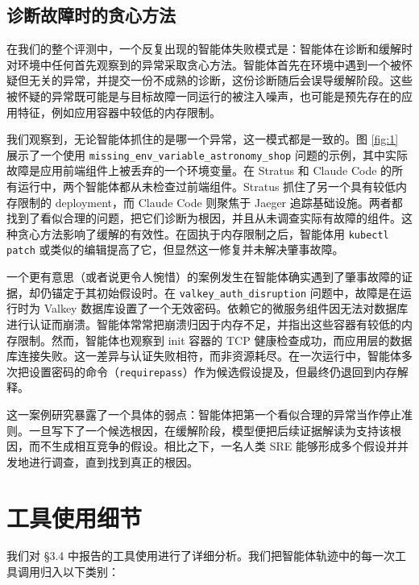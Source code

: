 \documentclass[11pt,UTF8,fontset=fandol]{ctexart}
\begin{document}
\subsection{诊断故障时的贪心方法}

在我们的整个评测中，一个反复出现的智能体失败模式是：智能体在诊断和缓解时对环境中任何首先观察到的异常采取贪心方法。智能体首先在环境中遇到一个被怀疑但无关的异常，并提交一份不成熟的诊断，这份诊断随后会误导缓解阶段。这些被怀疑的异常既可能是与目标故障一同运行的被注入噪声，也可能是预先存在的应用特征，例如应用容器中较低的内存限制。

我们观察到，无论智能体抓住的是哪一个异常，这一模式都是一致的。图 \ref{fig:1} 展示了一个使用 \texttt{missing\_env\_variable\_astronomy\_shop} 问题的示例，其中实际故障是应用前端组件上被丢弃的一个环境变量。在 Stratus 和 Claude Code 的所有运行中，两个智能体都从未检查过前端组件。Stratus 抓住了另一个具有较低内存限制的 deployment，而 Claude Code 则聚焦于 Jaeger 追踪基础设施。两者都找到了看似合理的问题，把它们诊断为根因，并且从未调查实际有故障的组件。这种贪心方法影响了缓解的有效性。在固执于内存限制之后，智能体用 \texttt{kubectl patch} 或类似的编辑提高了它，但显然这一修复并未解决肇事故障。

一个更有意思（或者说更令人惋惜）的案例发生在智能体确实遇到了肇事故障的证据，却仍锚定于其初始假设时。在 \texttt{valkey\_auth\_disruption} 问题中，故障是在运行时为 Valkey 数据库设置了一个无效密码。依赖它的微服务组件因无法对数据库进行认证而崩溃。智能体常常把崩溃归因于内存不足，并指出这些容器有较低的内存限制。然而，智能体也观察到 init 容器的 TCP 健康检查成功，而应用层的数据库连接失败。这一差异与认证失败相符，而非资源耗尽。在一次运行中，智能体多次把设置密码的命令（\texttt{requirepass}）作为候选假设提及，但最终仍退回到内存解释。

这一案例研究暴露了一个具体的弱点：智能体把第一个看似合理的异常当作停止准则。一旦写下了一个候选根因，在缓解阶段，模型便把后续证据解读为支持该根因，而不生成相互竞争的假设。相比之下，一名人类 SRE 能够形成多个假设并并发地进行调查，直到找到真正的根因。

\section{工具使用细节}

我们对 §3.4 中报告的工具使用进行了详细分析。我们把智能体轨迹中的每一次工具调用归入以下类别：
\end{document}
